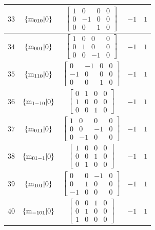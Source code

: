 \documentclass[fleqn,8pt]{jsarticle}
\begin{document}
\begin{longtable}{ccccc}
$ 33 $ & $ \{{\rm m}_{010}|0\} $ & $ \begin{bmatrix} 1 & 0 & 0 & 0 \\ 0 & -1 & 0 & 0 \\ 0 & 0 & 1 & 0 \end{bmatrix} $ & $ -1 $ & $ 1 $ \\ \hline
$ 34 $ & $ \{{\rm m}_{001}|0\} $ & $ \begin{bmatrix} 1 & 0 & 0 & 0 \\ 0 & 1 & 0 & 0 \\ 0 & 0 & -1 & 0 \end{bmatrix} $ & $ -1 $ & $ 1 $ \\ \hline
$ 35 $ & $ \{{\rm m}_{110}|0\} $ & $ \begin{bmatrix} 0 & -1 & 0 & 0 \\ -1 & 0 & 0 & 0 \\ 0 & 0 & 1 & 0 \end{bmatrix} $ & $ -1 $ & $ 1 $ \\ \hline
$ 36 $ & $ \{{\rm m}_{1-10}|0\} $ & $ \begin{bmatrix} 0 & 1 & 0 & 0 \\ 1 & 0 & 0 & 0 \\ 0 & 0 & 1 & 0 \end{bmatrix} $ & $ -1 $ & $ 1 $ \\ \hline
$ 37 $ & $ \{{\rm m}_{011}|0\} $ & $ \begin{bmatrix} 1 & 0 & 0 & 0 \\ 0 & 0 & -1 & 0 \\ 0 & -1 & 0 & 0 \end{bmatrix} $ & $ -1 $ & $ 1 $ \\ \hline
$ 38 $ & $ \{{\rm m}_{01-1}|0\} $ & $ \begin{bmatrix} 1 & 0 & 0 & 0 \\ 0 & 0 & 1 & 0 \\ 0 & 1 & 0 & 0 \end{bmatrix} $ & $ -1 $ & $ 1 $ \\ \hline
$ 39 $ & $ \{{\rm m}_{101}|0\} $ & $ \begin{bmatrix} 0 & 0 & -1 & 0 \\ 0 & 1 & 0 & 0 \\ -1 & 0 & 0 & 0 \end{bmatrix} $ & $ -1 $ & $ 1 $ \\ \hline
$ 40 $ & $ \{{\rm m}_{-101}|0\} $ & $ \begin{bmatrix} 0 & 0 & 1 & 0 \\ 0 & 1 & 0 & 0 \\ 1 & 0 & 0 & 0 \end{bmatrix} $ & $ -1 $ & $ 1 $ \\ \hline

\end{longtable}
\end{document}
